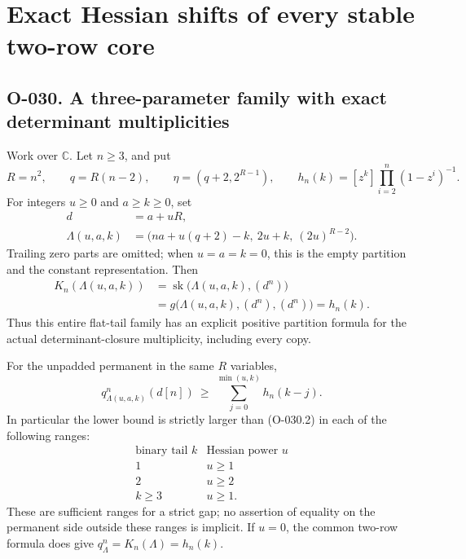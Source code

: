 \section{Exact Hessian shifts of every stable two-row core}

\subsection*{O-030. A three-parameter family with exact determinant multiplicities}
Work over \(\mathbb C\). Let \(n\geq3\), and put
\[
 R=n^2,\qquad q=R(n-2),\qquad
 \eta=(q+2,2^{R-1}),\qquad
 h_n(k)=[z^k]\prod_{i=2}^{n}(1-z^i)^{-1}.
\]
For integers \(u\geq0\) and \(a\geq k\geq0\), set
\[
 \begin{split}
 d&=a+uR,\\
 \Lambda(u,a,k)
   &=\bigl(na+u(q+2)-k,\ 2u+k,\ (2u)^{R-2}\bigr).
 \end{split}                                                   \tag{O-030.1}
\]
Trailing zero parts are omitted; when \(u=a=k=0\), this
is the empty partition and the constant representation.
Then
\[
 \boxed{\begin{aligned}
 K_n(\Lambda(u,a,k))
  &=\operatorname{sk}\bigl(\Lambda(u,a,k),(d^n)\bigr)\\
  &=g\bigl(\Lambda(u,a,k),(d^n),(d^n)\bigr)=h_n(k).
 \end{aligned}}                                                \tag{O-030.2}
\]
Thus this entire flat-tail family has an explicit positive
partition formula for the actual determinant-closure
multiplicity, including every copy.

For the unpadded permanent in the same \(R\) variables,
\[
 \boxed{\displaystyle
 q^n_{\Lambda(u,a,k)}(d[n])
       \ \geq\ \sum_{j=0}^{\min(u,k)}h_n(k-j).}                 \tag{O-030.3}
\]
In particular the lower bound is strictly larger than
(O-030.2) in each of the following ranges:
\[
 \begin{array}{c|c}
 \text{binary tail }k&\text{Hessian power }u\\ \hline
 1&u\geq1\\
 2&u\geq2\\
 k\geq3&u\geq1 .
 \end{array}                                                   \tag{O-030.4}
\]
These are sufficient ranges for a strict gap; no assertion
of equality on the permanent side outside these ranges
is implicit. If \(u=0\), the common two-row formula does
give \(q^n_{\Lambda}=K_n(\Lambda)=h_n(k)\).

